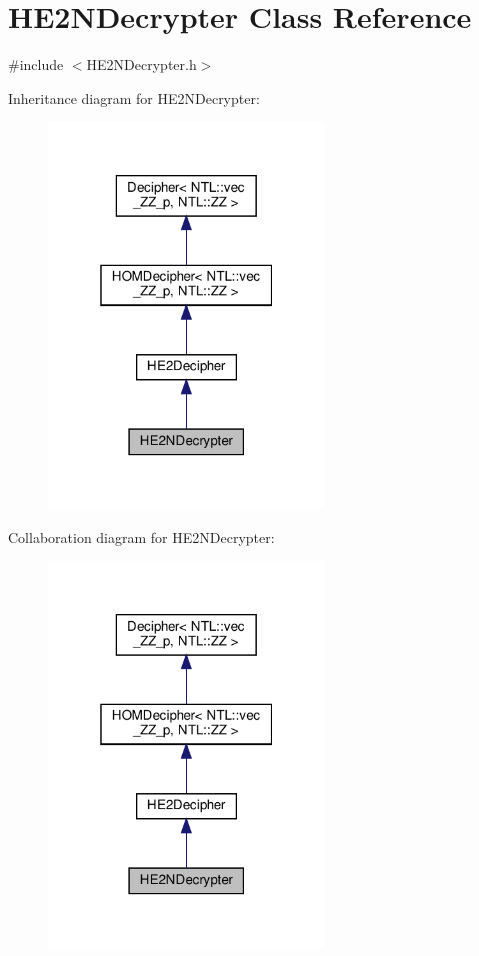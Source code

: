 \hypertarget{classHE2NDecrypter}{}\section{H\+E2\+N\+Decrypter Class Reference}
\label{classHE2NDecrypter}


{\ttfamily \#include $<$H\+E2\+N\+Decrypter.\+h$>$}



Inheritance diagram for H\+E2\+N\+Decrypter\+:
\nopagebreak
\begin{figure}[H]
\begin{center}
\leavevmode
\includegraphics[width=208pt]{classHE2NDecrypter__inherit__graph}
\end{center}
\end{figure}


Collaboration diagram for H\+E2\+N\+Decrypter\+:
\nopagebreak
\begin{figure}[H]
\begin{center}
\leavevmode
\includegraphics[width=208pt]{classHE2NDecrypter__coll__graph}
\end{center}
\end{figure}
